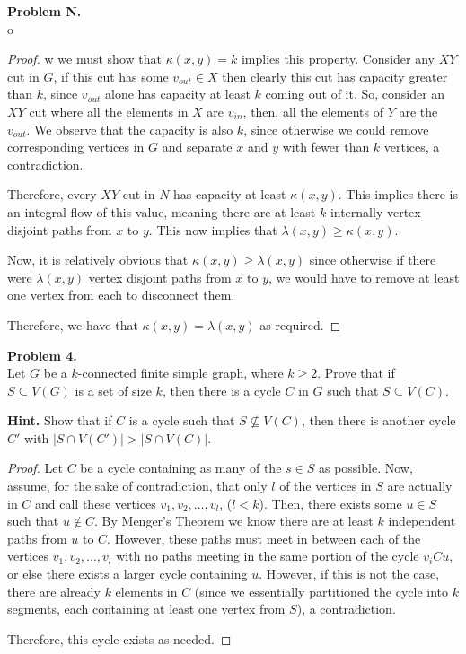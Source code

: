 \documentclass{article}
\newenvironment{hwproof}[2]
{
    \textbf{Problem #1.}\\
    #2
    \begin{proof}
}{
    \end{proof}
    \newpage
}
\begin{document}
\begin{hwproof}
    Now we must show that $\kappa(x,y) = k$ implies this property. Consider any $XY$ cut in $G$, if this cut has some $v_{out} \in X$ then clearly this cut has
    capacity greater than $k$, since $v_{out}$ alone has capacity at least $k$ coming out of it. So, consider an $XY$ cut where all the elements in $X$ are
    $v_{in}$, then, all the elements of $Y$ are the $v_{out}$. We observe that the capacity is also $k$, since otherwise we could remove corresponding vertices in
    $G$ and separate $x$ and $y$ with fewer than $k$ vertices, a contradiction.

    Therefore, every $XY$ cut in $N$ has capacity at least $\kappa(x,y)$. This implies there is an integral flow of this value, meaning there are at least $k$
    internally vertex disjoint paths from $x$ to $y$. This now implies that $\lambda(x,y) \geq \kappa(x,y)$.

    Now, it is relatively obvious that $\kappa(x,y) \geq \lambda(x,y)$ since otherwise if there were $\lambda(x,y)$ vertex disjoint paths from $x$ to $y$, we would have
    to remove at least one vertex from each to disconnect them.

    Therefore, we have that $\kappa(x,y) = \lambda(x,y)$ as required.

\end{hwproof}

\begin{hwproof}
    {4}
    {Let $G$ be a $k$-connected finite simple graph, where $k \geq 2$. Prove that if $S \subseteq V(G)$ is a set of size $k$, then there is a cycle $C$ in $G$ such that $S \subseteq V(C)$.

        \textbf{Hint.} Show that if $C$ is a cycle such that $S \not \subseteq V(C)$, then there is another cycle $C'$ with $|S \cap V(C')| > |S \cap V(C)|$.}

    Let $C$ be a cycle containing as many of the $s \in S$ as possible. Now, assume, for the sake of contradiction, that only $l$ of the vertices in $S$ are actually
    in $C$ and call these vertices $v_1, v_2, \dots, v_l$, ($l < k$). Then, there exists some $u \in S$ such that $u \not \in C$. By Menger's Theorem we know
    there are at least $k$ independent paths from $u$ to $C$. However, these paths must meet in between each of the vertices $v_1, v_2,\dots ,v_l$ with no paths
    meeting in the same portion of the cycle $v_iCu$, or else there exists a larger cycle containing $u$. However, if this is not the case, there are already
    $k$ elements in $C$ (since we essentially partitioned the cycle into $k$ segments, each containing at least one vertex from $S$), a contradiction.

    Therefore, this cycle exists as needed.
\end{hwproof}
\end{document}
